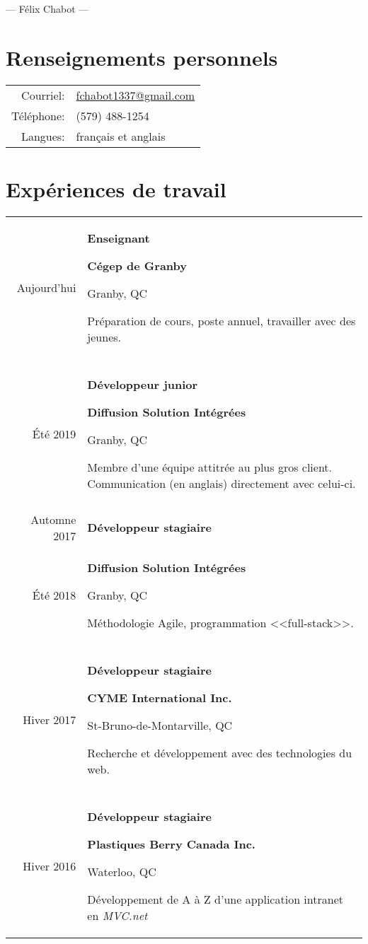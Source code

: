 \documentclass[french]{article}
\newcommand{\separation}{\multicolumn{1}{c}{} \\}
\begin{document}
	\begin{center}
		{\Huge --- Félix Chabot ---}
	\end{center}

	\section{Renseignements personnels}
	\begin{tabu} to \textwidth {rX}
		Courriel: & \href{mailto:fchabot1337@gmail.com}{fchabot1337@gmail.com} \\
		Téléphone: & (579) 488-1254 \\
		Langues: & français et anglais \\
	\end{tabu}
	\section{Expériences de travail}
	\begin{tabu} to \textwidth {r|X}
		Aujourd'hui & {
			{\large \bfseries Enseignant}

			\textbf{Cégep de Granby}

			{\footnotesize Granby, QC}

			Préparation de cours, poste annuel, travailler avec des jeunes.
		} \\

		\separation{}
		Été 2019 & {
			{\large \bfseries Développeur junior}

			\textbf{Diffusion Solution Intégrées}

			{\footnotesize Granby, QC}

			Membre d'une équipe attitrée au plus gros client. Communication (en anglais) directement avec celui-ci.
		} \\

		\separation{}
		Automne 2017 & {\large \bfseries Développeur stagiaire} \\
		Été 2018 & {
			\textbf{Diffusion Solution Intégrées}

			{\footnotesize Granby, QC}

			Méthodologie Agile, programmation <<full-stack>>.
		} \\

		\separation{}
		Hiver 2017 & {
			{\large \bfseries Développeur stagiaire}

			\textbf{CYME International Inc.}

			{\footnotesize St-Bruno-de-Montarville, QC}

			Recherche et développement avec des technologies du web.
		} \\

		\separation{}
		Hiver 2016 & {
			{\large \bfseries Développeur stagiaire}

			\textbf{Plastiques Berry Canada Inc.}

			{\footnotesize Waterloo, QC}

			Développement de A à Z d'une application intranet en \textit{MVC.net}
		} \\
	\end{tabu}
\end{document}
